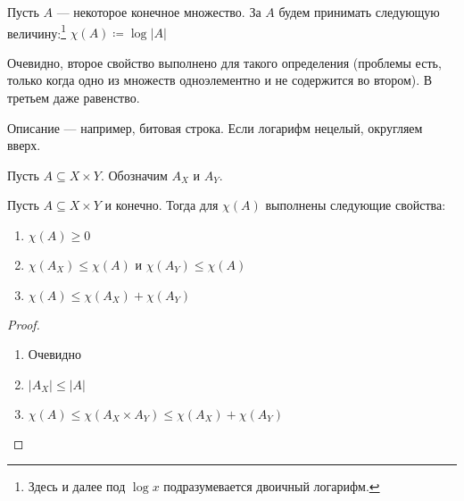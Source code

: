 \begin{defn}
	Пусть $ A$ --- некоторое конечное множество. За   $ A$ будем принимать следующую величину:\footnote{Здесь и далее под $ \log x$ подразумевается двоичный логарифм.}
	$ \chi(A) \coloneqq  \log \lvert A \rvert $
\end{defn}
\begin{note}
Очевидно, второе свойство выполнено для такого определения (проблемы есть, только когда одно из множеств одноэлементно и не содержится во втором). В третьем даже равенство. 

Описание --- например, битовая строка. Если логарифм нецелый, округляем вверх.
\end{note}
Пусть $ A  \subseteq X \times Y$. Обозначим  $ A_X$ и $ A_{Y}$.
\begin{figure}[ht]
    \centering
    \label{fig:axy-img}
\end{figure}
\begin{st}
	Пусть $ A \subseteq X\times Y$ и конечно. Тогда для $ \chi(A)$ выполнены следующие свойства:
\begin{enumerate}
	\item $ \chi(A) \ge 0$
	\item $ \chi(A_{X}) \le \chi(A)$ и $ \chi(A_{Y}) \le \chi(A)$
	\item $ \chi(A) \le \chi(A_{X}) + \chi(A_{Y})$
\end{enumerate} 
\end{st}
\begin{proof}
    \begin{enumerate}
        \item Очевидно
        \item $\lvert A_X \rvert \le \lvert A \rvert$
        \item $\chi(A) \le \chi(A_X \times A_Y) \le \chi(A_X) + \chi(A_Y)$
    \end{enumerate}
\end{proof}

